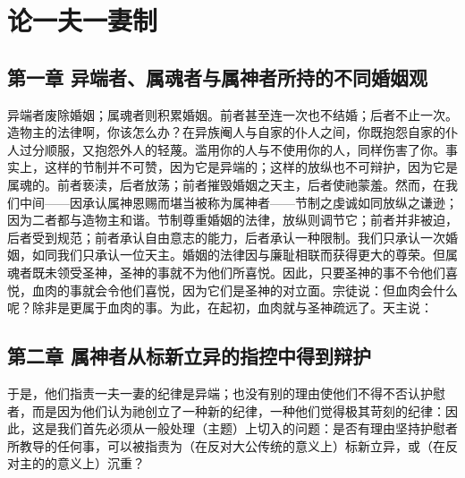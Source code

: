 
\chapter{论一夫一妻制}



\section{第一章 异端者、属魂者与属神者所持的不同婚姻观}

异端者废除婚姻；属魂者则积累婚姻。前者甚至连一次也不结婚；后者不止一次。造物主的法律啊，你该怎么办？在异族阉人与自家的仆人之间，你既抱怨自家的仆人过分顺服，又抱怨外人的轻蔑。滥用你的人与不使用你的人，同样伤害了你。事实上，这样的节制并不可赞，因为它是异端的；这样的放纵也不可辩护，因为它是属魂的。前者亵渎，后者放荡；前者摧毁婚姻之天主，后者使祂蒙羞。然而，在我们中间——因承认属神恩赐而堪当被称为属神者——节制之虔诚如同放纵之谦逊；因为二者都与造物主和谐。节制尊重婚姻的法律，放纵则调节它；前者并非被迫，后者受到规范；前者承认自由意志的能力，后者承认一种限制。我们只承认一次婚姻，如同我们只承认一位天主。婚姻的法律因与廉耻相联而获得更大的尊荣。但属魂者既未领受圣神，圣神的事就不为他们所喜悦。因此，只要圣神的事不令他们喜悦，血肉的事就会令他们喜悦，因为它们是圣神的对立面。宗徒说：但血肉会什么呢？除非是更属于血肉的事。为此，在起初，血肉就与圣神疏远了。天主说：\par


\section{第二章 属神者从标新立异的指控中得到辩护}

于是，他们指责一夫一妻的纪律是异端；也没有别的理由使他们不得不否认护慰者，而是因为他们认为祂创立了一种新的纪律，一种他们觉得极其苛刻的纪律：因此，这是我们首先必须从一般处理（主题）上切入的问题：是否有理由坚持护慰者所教导的任何事，可以被指责为（在反对大公传统的意义上）标新立异，或（在反对主的的意义上）沉重？\par

